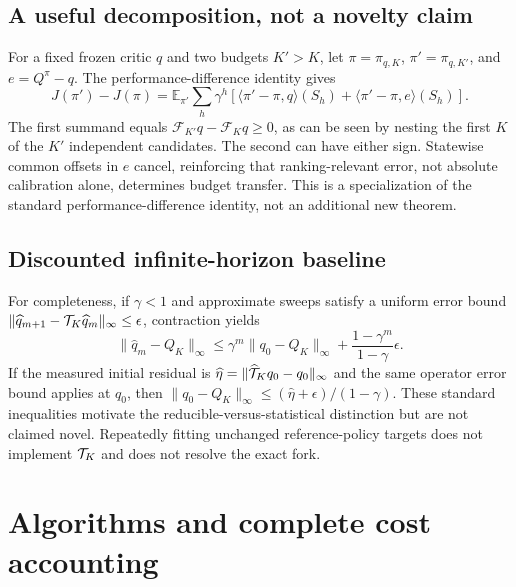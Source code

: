 \documentclass[11pt]{article}
\newcommand{\E}{\mathbb E}\newcommand{\Prb}{\mathbb P}\newcommand{\R}{\mathbb R}
\newcommand{\cF}{\mathcal F}\newcommand{\cC}{\mathcal C}
\begin{document}
\subsection{A useful decomposition, not a novelty claim}
For a fixed frozen critic $q$ and two budgets $K'>K$, let $\pi=\pi_{q,K}$, $\pi'=\pi_{q,K'}$, and $e=Q^\pi-q$. The performance-difference identity gives
\begin{equation}
 J(\pi')-J(\pi)=\E_{\pi'}\sum_h\gamma^h\left[
 \langle\pi'-\pi,q\rangle(S_h)+\langle\pi'-\pi,e\rangle(S_h)\right].
 \label{eq:transport}
\end{equation}
The first summand equals $\cF_{K'}q-\cF_Kq\ge0$, as can be seen by nesting the first $K$ of the $K'$ independent candidates. The second can have either sign. Statewise common offsets in $e$ cancel, reinforcing that ranking-relevant error, not absolute calibration alone, determines budget transfer. This is a specialization of the standard performance-difference identity, not an additional new theorem.

\subsection{Discounted infinite-horizon baseline}
For completeness, if $\gamma<1$ and approximate sweeps satisfy a uniform error bound
$\|\widehat q_{m+1}-\mathcal T_K\widehat q_m\|_\infty\le\epsilon$, contraction yields
\[
 \|\widehat q_m-Q_K\|_\infty
 \le\gamma^m\|q_0-Q_K\|_\infty+
 \frac{1-\gamma^m}{1-\gamma}\epsilon.
\]
If the measured initial residual is $\widehat\eta=\|\widehat{\mathcal T}_Kq_0-q_0\|_\infty$ and the same operator error bound applies at $q_0$, then
$\|q_0-Q_K\|_\infty\le(\widehat\eta+\epsilon)/(1-\gamma)$.
These standard inequalities motivate the reducible-versus-statistical distinction but are not claimed novel. Repeatedly fitting unchanged reference-policy targets does not implement $\mathcal T_K$ and does not resolve the exact fork.

\section{Algorithms and complete cost accounting}
\end{document}
